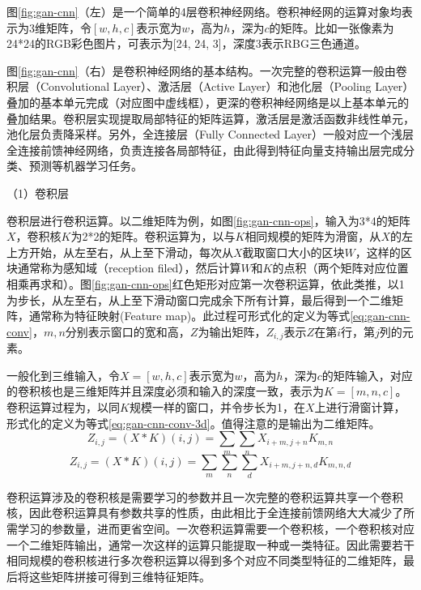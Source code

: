 图\ref{fig:gan-cnn}（左）是一个简单的4层卷积神经网络。卷积神经网的运算对象均表示为3维矩阵，令$[w, h, c]$表示宽为$w$，高为$h$，深为$c$的矩阵。比如一张像素为24*24的RGB彩色图片，可表示为[24, 24, 3]，深度3表示RBG三色通道。

图\ref{fig:gan-cnn}（右）是卷积神经网络的基本结构。一次完整的卷积运算一般由卷积层（Convolutional Layer）、激活层（Active Layer）和池化层（Pooling Layer）叠加的基本单元完成（对应图中虚线框），更深的卷积神经网络是以上基本单元的叠加结果。卷积层实现提取局部特征的矩阵运算，激活层是激活函数非线性单元，池化层负责降采样。另外，全连接层（Fully Connected Layer）一般对应一个浅层全连接前馈神经网络，负责连接各局部特征，由此得到特征向量支持输出层完成分类、预测等机器学习任务。

（1）卷积层

卷积层进行卷积运算。以二维矩阵为例，如图\ref{fig:gan-cnn-ops}，输入为3*4的矩阵$X$，卷积核$K$为2*2的矩阵。卷积运算为，以与$K$相同规模的矩阵为滑窗，从$X$的左上方开始，从左至右，从上至下滑动，每次从$X$截取窗口大小的区块$W$，这样的区块通常称为感知域（reception filed），然后计算$W$和$K$的点积（两个矩阵对应位置相乘再求和）。图\ref{fig:gan-cnn-ops}红色矩形对应第一次卷积运算，依此类推，以1为步长，从左至右，从上至下滑动窗口完成余下所有计算，最后得到一个二维矩阵，通常称为特征映射(Feature map)。此过程可形式化的定义为等式\ref{eq:gan-cnn-conv}，$m,n$分别表示窗口的宽和高，$Z$为输出矩阵，$Z_{i,j}$表示$Z$在第$i$行，第$j$列的元素。

一般化到三维输入，令$X=[w, h, c]$表示宽为$w$，高为$h$，深为$c$的矩阵输入，对应的卷积核也是三维矩阵并且深度必须和输入的深度一致，表示为$K=[m, n, c]$。卷积运算过程为，以同$K$规模一样的窗口，并令步长为1，在$X$上进行滑窗计算，形式化的定义为等式\ref{eq:gan-cnn-conv-3d}。值得注意的是输出为二维矩阵。
\begin{equation}
\label{eq:gan-cnn-conv}
Z_{i,j} = (X*K)(i,j) = \sum_{m}\sum_{n}X_{i+m, j+n}K_{m,n}
\end{equation}
\begin{equation}
\label{eq:gan-cnn-conv-3d}
Z_{i,j} = (X*K)(i,j) = \sum_{m}\sum_{n}\sum_{d}X_{i+m, j+n,d}K_{m,n,d}
\end{equation}

卷积运算涉及的卷积核是需要学习的参数并且一次完整的卷积运算共享一个卷积核，因此卷积运算具有参数共享的性质，由此相比于全连接前馈网络大大减少了所需学习的参数量，进而更省空间。一次卷积运算需要一个卷积核，一个卷积核对应一个二维矩阵输出，通常一次这样的运算只能提取一种或一类特征。因此需要若干相同规模的卷积核进行多次卷积运算以得到多个对应不同类型特征的二维矩阵，最后将这些矩阵拼接可得到三维特征矩阵。

